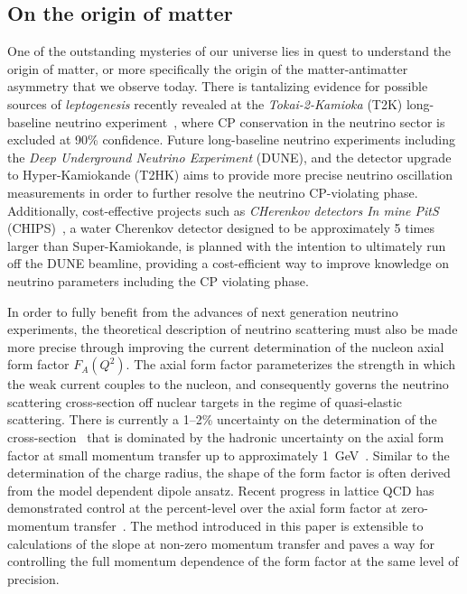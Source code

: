 \documentclass[prd,aps,twocolumn,superscriptaddress,tightenlines,nofootinbib,floatfix,preprintnumbers,10pt]{revtex4-1}
\begin{document}
\subsection{On the origin of matter}
One of the outstanding mysteries of our universe lies in quest to understand the origin of matter, or more specifically the origin of the matter-antimatter asymmetry that we observe today. There is tantalizing evidence for possible sources of \textit{leptogenesis} recently revealed at the \textit{Tokai-2-Kamioka} (T2K) long-baseline neutrino experiment~\cite{Abe:2017uxa}, where CP conservation in the neutrino sector is excluded at 90\% confidence.  Future long-baseline neutrino experiments including the \textit{Deep Underground Neutrino Experiment} (DUNE), and the detector upgrade to Hyper-Kamiokande (T2HK) aims to provide more precise neutrino oscillation measurements in order to further resolve the neutrino CP-violating phase. Additionally, cost-effective projects such as \textit{CHerenkov detectors In mine PitS} (CHIPS)~\cite{Adamson:2013xka}, a water Cherenkov detector designed to be approximately 5 times larger than Super-Kamiokande, is planned with the intention to ultimately run off the DUNE beamline, providing a cost-efficient way to improve knowledge on neutrino parameters including the CP violating phase.

In order to fully benefit from the advances of next generation neutrino experiments, the theoretical description of neutrino scattering must also be made more precise through improving the current determination of the nucleon axial form factor $F_A(Q^2)$. The axial form factor parameterizes the strength in which the weak current couples to the nucleon, and consequently governs the neutrino scattering cross-section off nuclear targets in the regime of quasi-elastic scattering. There is currently a 1--2\% uncertainty on the determination of the cross-section~\cite{Adams:2013qkq} that is dominated by the hadronic uncertainty on the axial form factor at small momentum transfer up to approximately 1~GeV~\cite{Day:2012gb}. Similar to the determination of the charge radius, the shape of the form factor is often derived from the model dependent dipole ansatz. Recent progress in lattice QCD has demonstrated control at the percent-level over the axial form factor at zero-momentum transfer~\cite{Chang:2017oll}. The method introduced in this paper is extensible to calculations of the slope at non-zero momentum transfer and paves a way for controlling the full momentum dependence of the form factor at the same level of precision.
\end{document}
